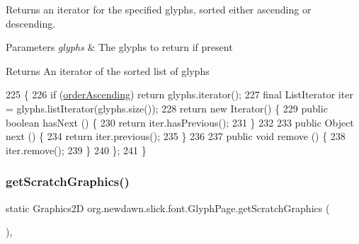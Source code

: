 Returns an iterator for the specified glyphs, sorted either ascending or descending.


\begin{DoxyParams}{Parameters}
{\em glyphs} & The glyphs to return if present \\
\hline
\end{DoxyParams}
\begin{DoxyReturn}{Returns}
An iterator of the sorted list of glyphs 
\end{DoxyReturn}

\begin{DoxyCode}
225                                               \{
226         \textcolor{keywordflow}{if} (\mbox{\hyperlink{classorg_1_1newdawn_1_1slick_1_1font_1_1_glyph_page_a2503df17a682f59d93a93acb3182075b}{orderAscending}}) \textcolor{keywordflow}{return} glyphs.iterator();
227         \textcolor{keyword}{final} ListIterator iter = glyphs.listIterator(glyphs.size());
228         \textcolor{keywordflow}{return} \textcolor{keyword}{new} Iterator() \{
229             \textcolor{keyword}{public} \textcolor{keywordtype}{boolean} hasNext () \{
230                 \textcolor{keywordflow}{return} iter.hasPrevious();
231             \}
232 
233             \textcolor{keyword}{public} Object next () \{
234                 \textcolor{keywordflow}{return} iter.previous();
235             \}
236 
237             \textcolor{keyword}{public} \textcolor{keywordtype}{void} \textcolor{keyword}{remove} () \{
238                 iter.remove();
239             \}
240         \};
241     \}
\end{DoxyCode}
\mbox{\label{classorg_1_1newdawn_1_1slick_1_1font_1_1_glyph_page_a0c33343f5d5b8c363cace62804c1d443}} 
\subsubsection{\texorpdfstring{get\+Scratch\+Graphics()}{getScratchGraphics()}}
{\footnotesize\ttfamily static Graphics2D org.\+newdawn.\+slick.\+font.\+Glyph\+Page.\+get\+Scratch\+Graphics (\begin{DoxyParamCaption}{ }\end{DoxyParamCaption})\hspace{0.3cm}{\ttfamily [inline]}, {\ttfamily [static]}}

